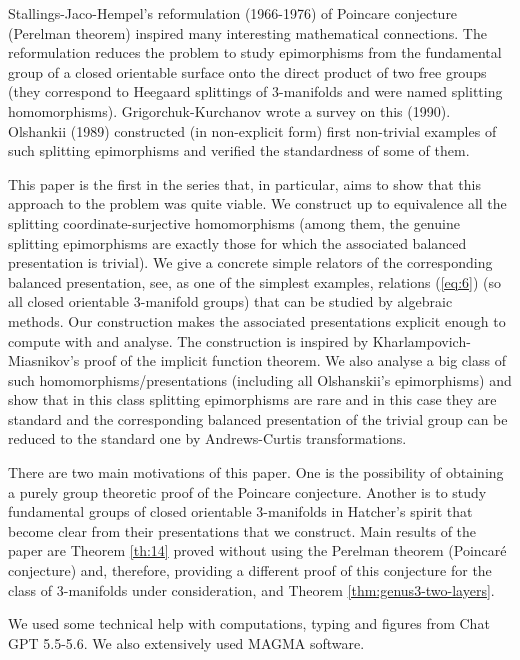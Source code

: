 \documentclass{article}
\begin{document}
Stallings-Jaco-Hempel's reformulation (1966-1976) of Poincare conjecture (Perelman theorem) inspired 
many interesting mathematical connections. The reformulation reduces the problem to study epimorphisms from the fundamental group of a closed orientable surface onto the direct product of two free groups (they correspond to Heegaard splittings of 3-manifolds and were named splitting homomorphisms). Grigorchuk-Kurchanov wrote a survey on this (1990). Olshankii (1989) constructed (in non-explicit form) first non-trivial examples of such splitting epimorphisms  and verified 
 the standardness of some of them.

This paper is the first in the series that, in particular,  aims to show that this approach to the problem was quite viable. We construct up to equivalence all the splitting coordinate-surjective homomorphisms (among them, the genuine splitting epimorphisms are exactly those for which
the associated balanced presentation is trivial).  We give a  concrete simple relators of the corresponding  balanced presentation, see, as one of the  simplest examples,  relations (\ref{eq:6}) (so all closed orientable 3-manifold groups) that can be studied by algebraic
methods. Our construction makes the associated presentations explicit enough to compute with and analyse. The construction is inspired by Kharlampovich-Miasnikov's proof of the implicit function theorem. We also analyse a big class of such homomorphisms/presentations (including all Olshanskii's epimorphisms)
 and show that in this class splitting epimorphisms are  rare and in this case they are standard and the corresponding balanced presentation of the trivial group can be reduced to the standard one  by Andrews-Curtis transformations. 

There are two  main motivations of this paper. One  is the  possibility of obtaining a purely group theoretic proof of the Poincare conjecture. Another is to study fundamental groups of closed orientable 3-manifolds in Hatcher's spirit  that become clear from their presentations that we construct. Main results of the paper  are Theorem \ref{th:14} proved without using the Perelman theorem (Poincar\'{e} conjecture) and, therefore, providing a different proof of this conjecture for the class of  3-manifolds under consideration, and 
Theorem \ref{thm:genus3-two-layers}.

We used some technical help with computations, typing and  figures  from Chat GPT 5.5-5.6. We also extensively used MAGMA software.
\end{document}
